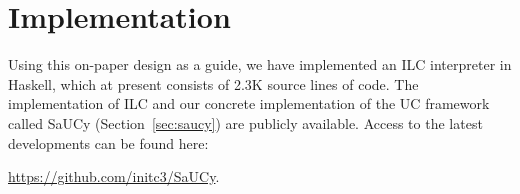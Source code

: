 \section{Implementation}
\label{sec:implementation}

Using this on-paper design as a guide, we have implemented an ILC interpreter in
Haskell, which at present consists of 2.3K source lines of code. The
implementation of ILC and our concrete implementation of the UC framework called
SaUCy (Section~\ref{sec:saucy}) are publicly available. Access to the latest
developments can be found here:\\
\centerline{\url{https://github.com/initc3/SaUCy}.}

%
%
%
%
